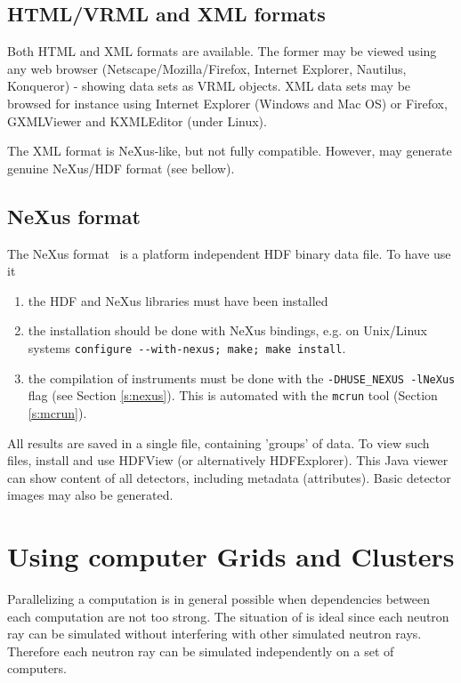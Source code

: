 \subsection{HTML/VRML and XML formats}
  

Both HTML and XML formats are available. The former may be viewed using any web browser (Netscape/Mozilla/Firefox, Internet Explorer, Nautilus, Konqueror) - showing data sets as VRML objects. XML data sets may be browsed for instance using Internet Explorer (Windows and Mac OS) or Firefox, GXMLViewer and KXMLEditor (under Linux).

The XML format is NeXus-like, but not fully compatible. However, \MCS may generate genuine NeXus/HDF format (see bellow).

\subsection{NeXus format}
  
\label{r:nexus}

The NeXus format~\cite{nexus_webpage} is a platform independent HDF binary data file. To have \MCS use it
\begin{enumerate}
\item the HDF and NeXus libraries must have been installed
\item the \MCS installation should be done with NeXus bindings, e.g. on Unix/Linux systems \verb+configure --with-nexus; make; make install+.
\item  the compilation of instruments must be done with the \verb+-DHUSE_NEXUS -lNeXus+ flag (see Section \ref{s:nexus}). This is automated with the \verb+mcrun+ tool (Section \ref{s:mcrun}).
\end{enumerate}
All results are saved in a single file, containing 'groups' of data. To view such files, install and use HDFView (or alternatively HDFExplorer). This Java viewer can show content of all detectors, including metadata (attributes). Basic detector images may also be generated.

\section{Using computer Grids and Clusters}
\label{s:run-mpi}

Parallelizing a computation is in general possible when dependencies between
  each computation are not too strong. The situation of \MCS is
  ideal since each neutron ray can be simulated without interfering with
  other simulated neutron rays. Therefore each neutron ray can be simulated
  independently on a set of computers.
  
